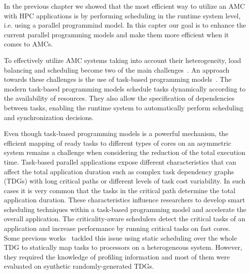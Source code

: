 
In the previous chapter we showed that the most efficient way to utilize an AMC with HPC applications is by performing scheduling in the runtime system level, i.e. using a parallel programmind model.
In this capter our goal is to enhance the current parallel programming models and make them more efficient when it comes to AMCs.

To effectively utilize AMC systems taking into account their heterogeneity, load balancing and scheduling become two of the main challenges~\cite{Li4}.
An approach towards these challenges is the use of task-based programming models~\cite{OmpSs_PPL11,OpenMP,StarSs,starpu}.
The modern task-based programming models schedule tasks dynamically according to the availability of resources. They also allow the specification of dependencies between tasks, enabling the runtime system to automatically perform scheduling and synchronization decisions.

Even though task-based programming models is a powerful mechanism, the efficient mapping of ready tasks to different types of cores on an asymmetric system remains a challenge when considering the reduction of the total execution time. 
Task-based parallel applications expose different characteristics that can affect the total application duration such as complex task dependency graphs (TDGs) with long critical paths or different levels of task cost variability.
In such cases it is very common that the tasks in the critical path determine the total application duration. 
These characteristics influence researchers to develop smart scheduling techniques within a task-based programming model and accelerate the overall application.
The criticality-aware schedulers detect the critical tasks of an application and increase performance by running critical tasks on fast cores. 
Some previous works~\cite{DCPS, LDCP, HEFT, CrPathDup} tackled this issue using static scheduling over the whole TDG to statically map tasks to processors on a heterogeneous system. 
However, they required the knowledge of profiling information and most of them were evaluated on synthetic randomly-generated TDGs. 

